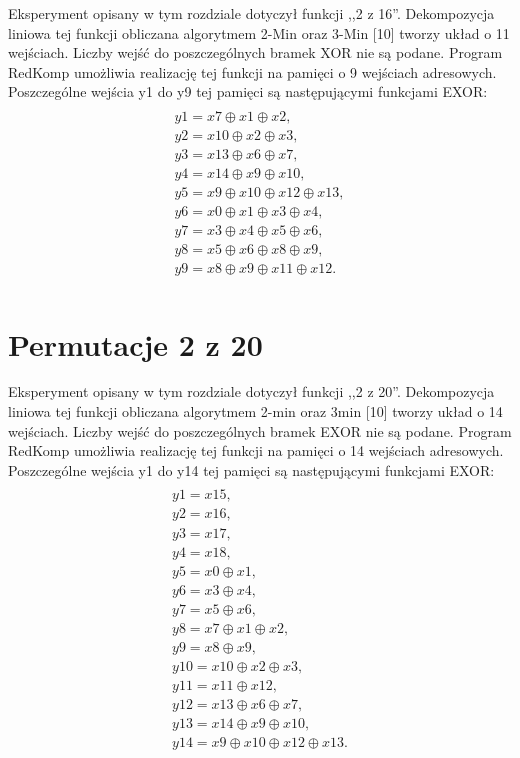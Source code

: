 Eksperyment opisany w tym rozdziale dotyczył funkcji ,,2 z 16''.
Dekompozycja liniowa tej funkcji obliczana algorytmem 2-Min oraz 3-Min [10] tworzy układ o 11 wejściach.
Liczby wejść do poszczególnych bramek XOR nie są podane.
Program RedKomp umożliwia realizację tej funkcji na pamięci o 9 wejściach adresowych.
Poszczególne wejścia y1 do y9 tej pamięci są następującymi funkcjami EXOR:
\begin{multline} \\
y1 = x7 \oplus x1 \oplus x2, \\
y2 = x10 \oplus x2 \oplus x3, \\
y3 = x13 \oplus x6 \oplus x7, \\
y4 = x14 \oplus x9 \oplus x10, \\
y5 = x9 \oplus x10 \oplus x12 \oplus x13, \\
y6 = x0 \oplus x1 \oplus x3 \oplus x4, \\
y7 = x3 \oplus x4 \oplus x5 \oplus x6, \\
y8 = x5 \oplus x6 \oplus x8 \oplus x9, \\
y9 = x8 \oplus x9 \oplus x11 \oplus x12. \\
\end{multline}

\section{Permutacje 2 z 20}

Eksperyment opisany w tym rozdziale dotyczył funkcji ,,2 z 20''.
Dekompozycja liniowa tej funkcji obliczana algorytmem 2-min oraz 3min [10] tworzy układ o 14 wejściach.
Liczby wejść do poszczególnych bramek EXOR nie są podane.
Program RedKomp umożliwia realizację tej funkcji na pamięci o 14 wejściach adresowych.
Poszczególne wejścia y1 do y14 tej pamięci są następującymi funkcjami EXOR:
\begin{multline} \\
y1 = x15, \\
y2 = x16, \\
y3 = x17, \\
y4 = x18, \\
y5 = x0 \oplus x1, \\
y6 = x3 \oplus x4, \\
y7 = x5 \oplus x6, \\
y8 = x7 \oplus x1 \oplus x2, \\
y9 = x8 \oplus x9, \\
y10 = x10 \oplus x2 \oplus x3, \\
y11 = x11 \oplus x12, \\
y12 = x13 \oplus x6 \oplus x7, \\
y13 = x14 \oplus x9 \oplus x10, \\
y14 = x9 \oplus x10 \oplus x12 \oplus x13. \\
\end{multline}

